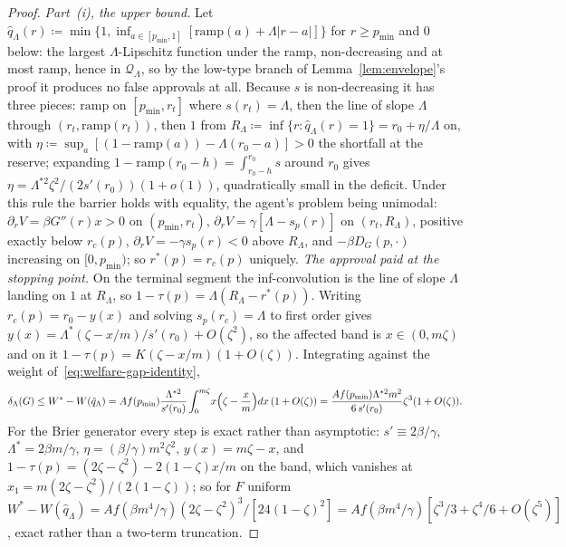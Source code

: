 \documentclass[acmsmall,nonacm,screen]{acmart}
\theoremstyle{acmplain}%
\theoremstyle{acmdefinition}%
\numberwithin{equation}{section}
\begin{document}
\begin{appendix}
\begin{proof}
\emph{Part~(i), the upper bound.} Let $\hat q_\Lambda(r)\coloneqq\min\{1,\inf_{a\in[p_{\min},1]}[\mathrm{ramp}(a)+\Lambda|r-a|]\}$ for $r\geq p_{\min}$ and $0$ below: the largest $\Lambda$-Lipschitz function under the ramp, non-decreasing and at most $\mathrm{ramp}$, hence in $\mathcal{Q}_\Lambda$, so by the low-type branch of Lemma~\ref{lem:envelope}'s proof it produces no false approvals at all. Because $s$ is non-decreasing it has three pieces: $\mathrm{ramp}$ on $[p_{\min},r_t]$ where $s(r_t)=\Lambda$, then the line of slope $\Lambda$ through $(r_t,\mathrm{ramp}(r_t))$, then $1$ from $R_\Lambda\coloneqq\inf\{r:\hat q_\Lambda(r)=1\}=r_0+\eta/\Lambda$ on, with $\eta\coloneqq\sup_a[(1-\mathrm{ramp}(a))-\Lambda(r_0-a)]>0$ the shortfall at the reserve; expanding $1-\mathrm{ramp}(r_0-h)=\int_{r_0-h}^{r_0}s$ around $r_0$ gives $\eta=\Lambda^{*2}\zeta^2/(2s'(r_0))(1+o(1))$, quadratically small in the deficit. Under this rule the barrier holds with equality, the agent's problem being unimodal: $\partial_rV=\beta G''(r)x>0$ on $(p_{\min},r_t)$, $\partial_rV=\gamma[\Lambda-s_p(r)]$ on $(r_t,R_\Lambda)$, positive exactly below $r_c(p)$, $\partial_rV=-\gamma s_p(r)<0$ above $R_\Lambda$, and $-\beta D_G(p,\cdot)$ increasing on $[0,p_{\min})$; so $r^*(p)=r_c(p)$ uniquely. \emph{The approval paid at the stopping point.} On the terminal segment the inf-convolution is the line of slope $\Lambda$ landing on $1$ at $R_\Lambda$, so $1-\tau(p)=\Lambda(R_\Lambda-r^*(p))$. Writing $r_c(p)=r_0-y(x)$ and solving $s_p(r_c)=\Lambda$ to first order gives $y(x)=\Lambda^*(\zeta-x/m)/s'(r_0)+O(\zeta^2)$, so the affected band is $x\in(0,m\zeta)$ and on it $1-\tau(p)=K(\zeta-x/m)(1+O(\zeta))$. Integrating against the weight of~\eqref{eq:welfare-gap-identity},
\[
\delta_\Lambda(G)\leq W^*-W(\hat q_\Lambda)=Af(p_{\min})\frac{\Lambda^{*2}}{s'(r_0)}\int_0^{m\zeta}\!x\Bigl(\zeta-\frac{x}{m}\Bigr)dx\,(1+O(\zeta))=\frac{Af(p_{\min})\Lambda^{*2}m^2}{6\,s'(r_0)}\zeta^3(1+O(\zeta)).
\]
For the Brier generator every step is exact rather than asymptotic: $s'\equiv2\beta/\gamma$, $\Lambda^*=2\beta m/\gamma$, $\eta=(\beta/\gamma)m^2\zeta^2$, $y(x)=m\zeta-x$, and $1-\tau(p)=(2\zeta-\zeta^2)-2(1-\zeta)x/m$ on the band, which vanishes at $x_1=m(2\zeta-\zeta^2)/(2(1-\zeta))$; so for $F$ uniform $W^*-W(\hat q_\Lambda)=Af(\beta m^4/\gamma)(2\zeta-\zeta^2)^3/[24(1-\zeta)^2]=Af(\beta m^4/\gamma)[\zeta^3/3+\zeta^4/6+O(\zeta^5)]$, exact rather than a two-term truncation.


\end{proof}
\end{appendix}
\end{document}
